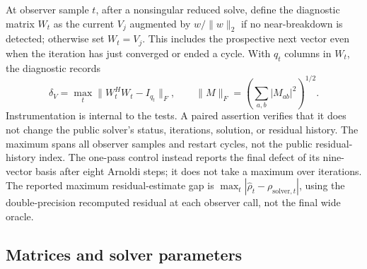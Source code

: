 At observer sample $t$, after a nonsingular reduced solve, define the diagnostic
matrix $W_t$ as the current $V_j$ augmented by $w/\lVert w\rVert_2$ if no
near-breakdown is detected; otherwise set $W_t=V_j$. This includes the prospective
next vector even when the iteration has just converged or ended a cycle. With
$q_t$ columns in $W_t$, the diagnostic records
\begin{equation}
    \delta_V=\max_t\lVert W_t^H W_t-I_{q_t}\rVert_F,
    \qquad \lVert M\rVert_F=
        \left(\sum_{a,b}|M_{ab}|^2\right)^{1/2}.
    \label{eq:orthogonality}
\end{equation}
Instrumentation is internal to the tests. A paired assertion verifies that it
does not change the public solver's status, iterations, solution, or residual
history. The maximum spans all observer samples and restart cycles, not the
public residual-history index. The one-pass control instead reports the final
defect of its nine-vector basis after eight Arnoldi steps; it does not take a
maximum over iterations. The reported maximum residual-estimate gap is
$\max_t|\widehat{\rho}_t-\rho_{\mathrm{solver},t}|$, using the double-precision
recomputed residual at each observer call, not the final wide oracle.

\subsection{Matrices and solver parameters}

